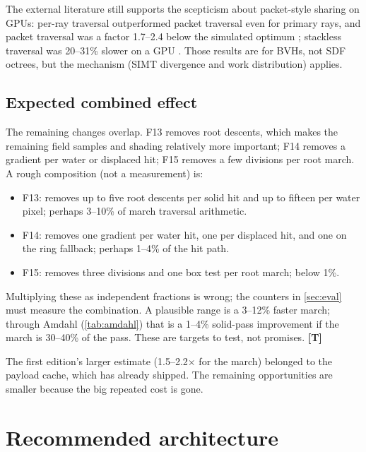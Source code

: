 \documentclass[11pt,a4paper]{article}
\newcommand{\evT}{\textsf{\textbf{\color{evT}[T]}}}
\theoremstyle{plain}
\theoremstyle{definition}
\theoremstyle{remark}
\begin{document}
The external literature still supports the scepticism about packet-style
sharing on GPUs: per-ray traversal outperformed packet traversal even for
primary rays, and packet traversal was a factor 1.7--2.4 below the simulated
optimum \cite{aila2009}; stackless traversal was 20--31\% slower on a GPU
\cite{afra2014}. Those results are for BVHs, not SDF octrees, but the mechanism
(SIMT divergence and work distribution) applies.

\subsection{Expected combined effect}

The remaining changes overlap. F13 removes root descents, which makes the
remaining field samples and shading relatively more important; F14 removes a
gradient per water or displaced hit; F15 removes a few divisions per root
march. A rough composition (not a measurement) is:
\begin{itemize}[leftmargin=1.3em,itemsep=1pt]
\item F13: removes up to five root descents per solid hit and up to fifteen per
      water pixel; perhaps 3--10\% of march traversal arithmetic.
\item F14: removes one gradient per water hit, one per displaced hit, and one
      on the ring fallback; perhaps 1--4\% of the hit path.
\item F15: removes three divisions and one box test per root march; below 1\%.
\end{itemize}
Multiplying these as independent fractions is wrong; the counters in
\cref{sec:eval} must measure the combination. A plausible range is a 3--12\%
faster march; through Amdahl (\cref{tab:amdahl}) that is a 1--4\% solid-pass
improvement if the march is 30--40\% of the pass. These are targets to test,
not promises. \evT

The first edition's larger estimate (1.5--2.2$\times$ for the march) belonged
to the payload cache, which has already shipped. The remaining opportunities
are smaller because the big repeated cost is gone.

\section{Recommended architecture}
\label{sec:rec}
\end{document}
